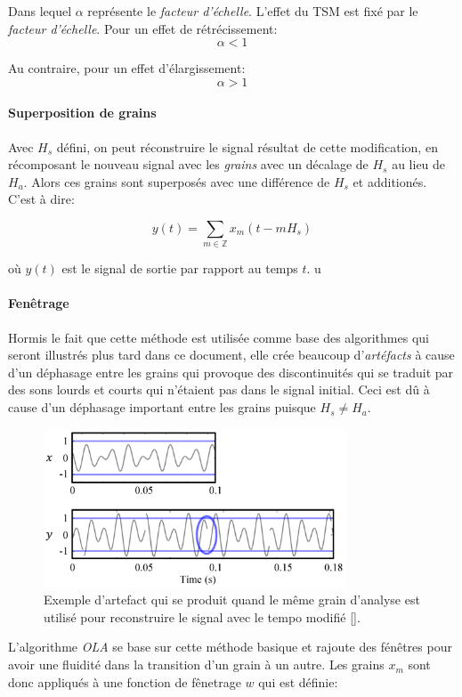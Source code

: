 \documentclass[letterpaper]{article}
\begin{document}
Dans lequel $\alpha$ représente le \emph{facteur d'échelle}.
L'effet du TSM est fixé par le \emph{facteur d'échelle}. Pour un effet de rétrécissement:
$$\alpha < 1$$

Au contraire, pour un effet d'élargissement:
$$\alpha > 1$$

\paragraph{Superposition de grains}

Avec $H_{s}$ défini, on peut réconstruire le signal résultat de cette modification, en récomposant
le nouveau signal avec les \emph{grains} avec un décalage de $H_{s}$ au lieu de $H_{a}$. Alors ces
grains sont superposés avec une différence de $H_{s}$ et additionés. C'est à dire:

$$ y(t) = \sum_{m \in \mathbb{Z}} x_{m}(t-mH_{s})$$

où $y(t)$ est le signal de sortie par rapport au temps $t$.
u
\paragraph {Fenêtrage}

Hormis le fait que cette méthode est utilisée comme base des algorithmes qui seront illustrés plus
tard dans ce document, elle crée beaucoup d'\emph{artéfacts} à cause d'un déphasage entre les
grains qui provoque des discontinuités qui se traduit par des sons lourds et courts qui n'étaient pas
dans le signal initial. Ceci est dû à cause d'un déphasage important entre les grains
puisque $H_{s} \neq H_{a}$.

\begin{figure}[h]
    \centerline{\includegraphics[width=9cm]{res/artifact.png}}
    \caption{\label{fig:artifact}Exemple d'artefact qui se produit quand le même grain d'analyse est
      utilisé pour reconstruire le signal avec le tempo modifié [\cite{TSMreview}]. }
  \end{figure}
  
L'algorithme \emph{OLA} se base sur cette méthode basique et rajoute des fénêtres pour avoir une
fluidité dans la transition d'un grain à un autre. Les grains $x_m$ sont donc appliqués à une fonction
de fênetrage $w$ qui est définie:
\end{document}
